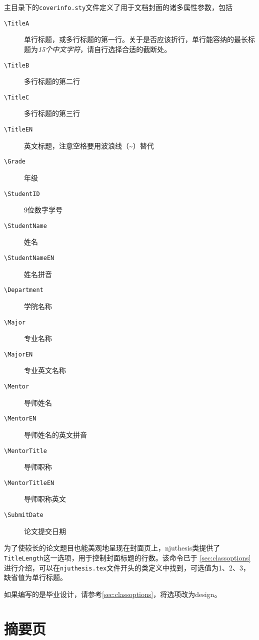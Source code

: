 主目录下的\texttt{coverinfo.sty}文件定义了用于文档封面的诸多属性参数，包括

\begin{description}
    \item[\texttt{\textbackslash TitleA}] 单行标题，或多行标题的第一行。关于是否应该折行，单行能容纳的最长标题为\emph{15个中文字符}，请自行选择合适的截断处。
    \item[\texttt{\textbackslash TitleB}] 多行标题的第二行
    \item[\texttt{\textbackslash TitleC}] 多行标题的第三行
    \item[\texttt{\textbackslash Title\textunderscore EN}] 英文标题，注意空格要用波浪线（\textasciitilde）替代
    \item[\texttt{\textbackslash Grade}] 年级
    \item[\texttt{\textbackslash StudentID}] 9位数字学号
    \item[\texttt{\textbackslash StudentName}] 姓名
    \item[\texttt{\textbackslash StudentName\textunderscore EN}] 姓名拼音 
    \item[\texttt{\textbackslash Department}] 学院名称
    \item[\texttt{\textbackslash Major}] 专业名称
    \item[\texttt{\textbackslash Major\textunderscore EN}] 专业英文名称
    \item[\texttt{\textbackslash Mentor}] 导师姓名
    \item[\texttt{\textbackslash Mentor\textunderscore EN}] 导师姓名的英文拼音  
    \item[\texttt{\textbackslash MentorTitle}] 导师职称
    \item[\texttt{\textbackslash MentorTitle\textunderscore EN}] 导师职称英文
    \item[\texttt{\textbackslash SubmitDate}] 论文提交日期
\end{description}

为了使较长的论文题目也能美观地呈现在封面页上，njuthesis类提供了\texttt{TitleLength}这一选项，用于控制封面标题的行数。该命令已于
\cref{sec:classoptions}进行介绍，可以在\texttt{njuthesis.tex}文件开头的类定义中找到，可选值为1、2、3，缺省值为单行标题。

如果编写的是毕业设计，请参考\cref{sec:classoptions}，将选项改为design。

\section{摘要页}

